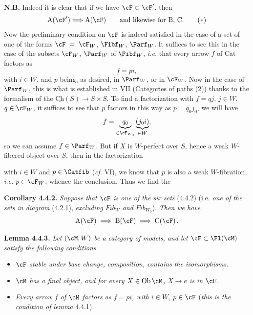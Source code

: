 \textbf{N.B.} Indeed it is clear that if we have $\cF \subset \cF'$, then
\[
\mathrm{A}(\cF') \Longrightarrow \mathrm{A}(\cF) \qquad \text{and likewise for B, C.}
\tag*{$(*)$}
\]
Now the preliminary condition on $\cF$ is indeed satisfied in the case of a set of one of the forms $\cF \;=\; \cF_W$, $\Fibf_W$, $\Parf_W$. It suffices to see this in the case of the subsets $\cF_W$, $\Parf_W$ of $\Fibf_W$, \textit{i.e.} that every arrow $f$ of Cat factors as
\[
f = pi,
\]
with $i \in W$, and $p$ being, as desired, in $\Parf_W$, or in $\cF_W$. Now in the case of $\Parf_W$, \marginpar{$\|$}this is what is established in VII (Categories of paths (2)) thanks to the formalism of the $\underline{\mathrm{Ch}}(S) \longrightarrow S \times S$. To find a factorization with $f = qj$, $j \in W$, $q \in \cF_W$, it suffices to see that $p$ factors in this way as $p = q_0 j_0$, we will have %
\[
f = \underbrace{q_0}_{\in \cF_{W_0}} \underbrace{(j_0 i)}_{\in W},
\]
so we can assume $f \in \Parf_W$. But if $X$ is $W$-perfect over $S$, hence a
weak $W$-fibered object over $S$, then in the factorization
\begin{center}
\end{center}
with $i \in W$ and $p \in \Catfib$ (\textit{cf.} VI), we know that $p$ is also a weak $W$-fibration, \textit{i.e.} $p \in \cF_W$, whence the conclusion. Thus we find the

\textbf{Corollary 4.4.2.} \textit{Suppose that $\cF$ is one of the six sets} (4.4.2) (i.e. \textit{one of the sets in diagram} (4.2.1), \textit{excluding $\mathit{Fib}_W$ and $\mathit{Fib}_{W_0}$}). \textit{Then we have}
\[
\mathrm{A}(\cF) \;\Longrightarrow\; \mathrm{B}(\cF) \;\Longrightarrow\; \mathrm{C}(\cF)\,.
\]

\textbf{Lemma 4.4.3.} \textit{Let $(\cM, W)$ be a category of models, and let $\cF \subset \Fl(\cM)$ satisfy the following conditions}
\begin{itemize}[leftmargin=3em]
\item[1)] \textit{$\cF$ stable under base change, composition, contains the isomorphisms.}
\item[2)] \textit{$\cM$ has a final object, and for every $X \in \mathrm{Ob}\,\cM$, $X \longrightarrow e$ is in $\cF$.}
\item[3)] \textit{Every arrow $f$ of $\cM$ factors as $f = pi$, with $i \in W$, $p \in \cF$} (\textit{this is the condition of lemma} 4.4.1).
\end{itemize}

